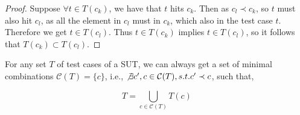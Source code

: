 \documentclass{sig-alternate}
\begin{document}
\begin{proof}
Suppose $ \forall t \in T(c_{k})$, we have that $t$ hits $c_{k}$. Then as $c_{l} \prec c_{k}$, so $t$ must also hit $c_{l}$, as all the element in $c_{l}$ must in $c_{k}$, which also in the test case $t$. Therefore we get $t \in T(c_{l})$. Thus $t \in T(c_{k})$ implies $t \in T(c_{l})$, so it follows that $T(c_{k}) \subset T(c_{l})$.
\end{proof}


\begin{proposition}

For any set $T$ of test cases of a SUT, we can always get a set of minimal combinations $\mathcal{C}(T) = \{c \}$, i.e., $\not\exists c', c \in \mathcal{C}(T), s.t. c' \prec  c $,  such that,

\begin{displaymath} T  =  \bigcup_{c \in \mathcal{C}(T)} T(c) \end{displaymath}

\end{proposition}
\end{document}
